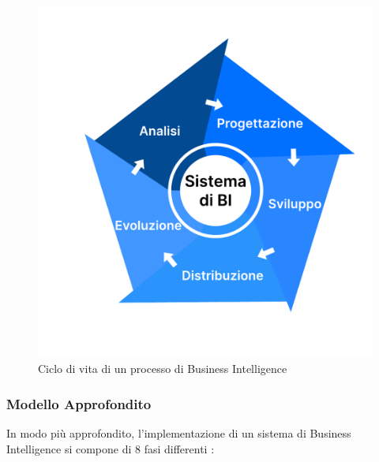 \begin{figure} [H]
    \centering
    \includegraphics[width=0.75\linewidth]{figure//capitolo_3/Business Intelligence Life Cycle.pdf}
    \caption{Ciclo di vita di un processo di Business Intelligence}
    \label{fig:Business Intelligence Life Cycle}
\end{figure}

\subsubsection{Modello Approfondito}

In modo più approfondito, l'implementazione di un sistema di Business Intelligence si compone di 8 fasi differenti \cite{altexsoft_bi_implementation}:

